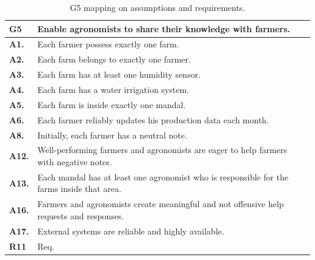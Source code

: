 \begin{table}[H]
    \centering
    \begin{tabularx}{\linewidth}{lX} \toprule
        \textbf{G5} & Enable agronomists to share their knowledge with farmers. \\ 
        \midrule
        \textbf{A1.} & Each farmer possess exactly one farm.\\
        \textbf{A2.} & Each farm belongs to exactly one farmer.\\ 
        \textbf{A3.} & Each farm has at least one humidity sensor.\\ 
        \textbf{A4.} & Each farm has a water irrigation system.\\ 
        \textbf{A5.} & Each farm is inside exactly one mandal.\\ 
        \textbf{A6.} & Each farmer reliably updates his production data each month.\\ 
        \textbf{A8.} & Initially, each farmer has a neutral note.\\ 
        \textbf{A12.} & Well-performing farmers and agronomists are eager to help farmers with negative notes.\\ 
        \textbf{A13.} & Each mandal has at least one agronomist who is responsible for the farms inside that area.\\ 
        \textbf{A16.} & Farmers and agronomists create meaningful and not offensive help requests and responses. \\
        \textbf{A17.} & External systems are reliable and highly available.\\
        \midrule
        \textbf{R11} &  Req. \\
        \bottomrule
    \end{tabularx}
    \caption{G5 mapping on assumptions and requirements.}
\end{table}

